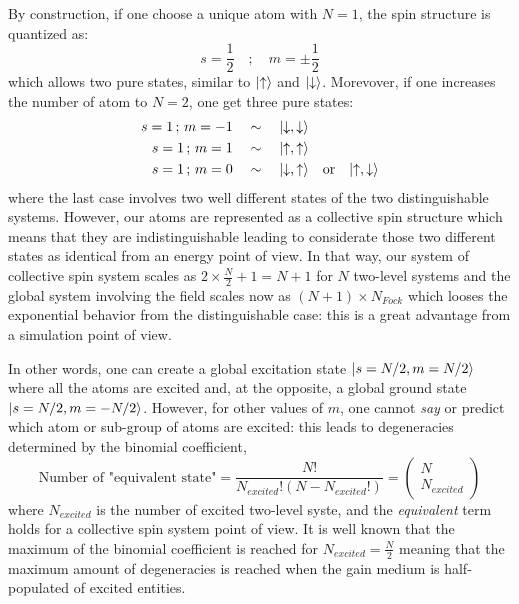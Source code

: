 \documentclass[11pt]{report}
\DeclarePairedDelimiter\ket{\lvert}{\rangle}
\begin{document}
By construction, if one choose a unique atom with $N=1$, the spin structure is quantized as:
\begin{equation}
s = \frac{1}{2} \quad; \quad m = \pm \frac{1}{2}
\end{equation}
which allows two pure states, similar to $\ket{\uparrow}$ and $\ket{\downarrow}$. Morevover, if one increases the number of atom to $N=2$, one get three pure states:
\begin{align*}
s = 1 \,;\, m = -1 \quad &\sim \quad \ket{\downarrow, \downarrow}\\
s = 1 \,;\, m = 1 \quad &\sim \quad \ket{\uparrow, \uparrow}\\
s = 1 \,;\, m = 0 \quad &\sim \quad \ket{\downarrow, \uparrow} \quad \textrm{or} \quad \ket{\uparrow, \downarrow}\\
\end{align*}
where the last case involves two well different states of the two distinguishable systems. However, our atoms are represented as a collective spin structure which means that they are indistinguishable leading to considerate those two different states as identical from an energy point of view. In that way, our system of collective spin system scales as $2 \times \frac{N}{2} + 1 = N + 1$ for $N$ two-level systems and the global system involving the field scales now as $(N+1) \times N_{Fock}$ which looses the exponential behavior from the distinguishable case: this is a great advantage from a simulation point of view.

In other words, one can create a global excitation state $\ket{s = N/2, m = N/2}$ where all the atoms are excited and, at the opposite, a global ground state $\ket{s = N/2, m = -N/2}$. However, for other values of $m$, one cannot \textit{say} or predict which atom or sub-group of atoms are excited: this leads to degeneracies determined by the binomial coefficient,
\begin{equation}
\textrm{Number of "equivalent state"} = \frac{N!}{N_{excited}!(N-N_{excited}!)} = \begin{pmatrix}
N\\
N_{excited}
\end{pmatrix} 	
\end{equation}
where $N_{excited}$ is the number of excited two-level syste, and the \textit{equivalent} term holds for a collective spin system point of view. It is well known that the maximum of the binomial coefficient is reached for $N_{excited} = \frac{N}{2}$ meaning that the maximum amount of degeneracies is reached when the gain medium is half-populated of excited entities.
\end{document}
